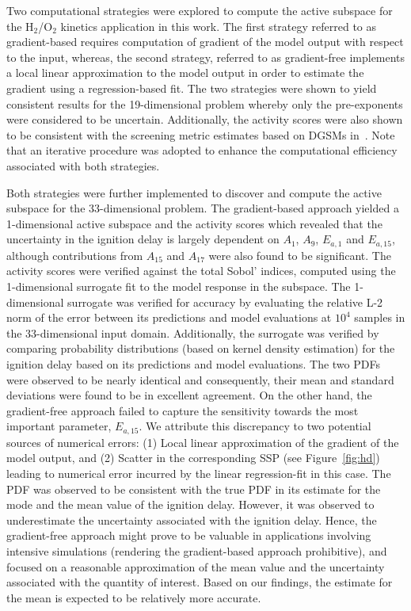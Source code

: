 Two computational strategies were explored to compute the active subspace for the H$_2$/O$_2$
kinetics application in this work. The first strategy referred to as gradient-based requires computation of gradient of the 
model output with respect to the input, whereas, the second strategy, referred to as gradient-free implements a local
linear approximation to the model output in order to estimate the gradient using a regression-based fit.
The two strategies were shown to yield
consistent results for the 19-dimensional problem whereby only the pre-exponents were considered to be uncertain.
Additionally, the activity scores were also shown to be consistent with the screening metric estimates based on
DGSMs in~\cite{Vohra:2018}. Note that an iterative procedure was adopted to enhance the computational efficiency
associated with both strategies. 

Both strategies were further implemented to discover and compute the active
subspace for the 33-dimensional problem. The gradient-based approach yielded a 1-dimensional active subspace
and the activity scores which revealed that the uncertainty in the ignition delay is largely dependent on $A_1$, $A_9$, 
$E_{a,1}$ and $E_{a,15}$, although contributions from $A_{15}$ and $A_{17}$ were also found to be significant. The activity
scores were verified against the total Sobol' indices, computed using the 1-dimensional surrogate fit to the model response in
the subspace. The 1-dimensional surrogate was verified for accuracy by evaluating the relative L-2
norm of the error between its predictions and model evaluations at $10^4$ samples in the 33-dimensional input domain.
Additionally, the surrogate was verified by comparing probability distributions (based on kernel density estimation) for
the ignition delay based on its predictions and model evaluations. The two PDFs were observed to be nearly identical
and consequently, their mean and standard deviations were found to be in excellent agreement. On the other hand,
the gradient-free approach failed to capture the sensitivity towards the most important parameter, $E_{a,15}$. 
We attribute this discrepancy to two potential sources of numerical errors: (1) Local linear approximation of the
gradient of the model output, and (2) Scatter in the corresponding SSP (see Figure~\ref{fig:hd}) leading to numerical
error incurred by the linear regression-fit in this case. The PDF was observed to be consistent with the true PDF in its
estimate for the mode and the mean value of the ignition delay. However, it was observed to underestimate the uncertainty 
associated with the ignition delay. Hence, the gradient-free approach might prove to be valuable in applications 
involving intensive simulations (rendering the gradient-based approach prohibitive), and focused on a reasonable 
approximation of the mean value and the uncertainty associated with the quantity of interest. Based on our findings, the 
estimate for the mean is expected to be relatively more accurate. 
 
